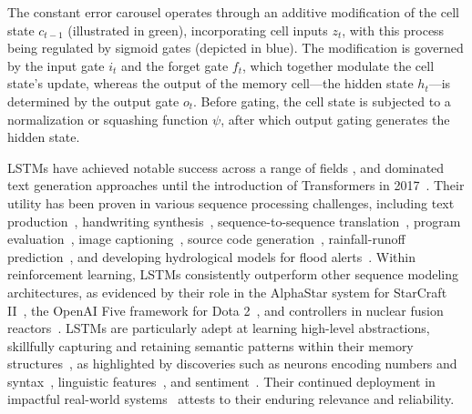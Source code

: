 The constant error carousel operates through an additive modification of the cell state $c_{t-1}$ (illustrated in green), incorporating cell inputs $z_t$, with this process being regulated by sigmoid gates (depicted in blue). The modification is governed by the input gate $i_t$ and the forget gate $f_t$, which together modulate the cell state's update, whereas the output of the memory cell—the hidden state $h_t$—is determined by the output gate $o_t$. Before gating, the cell state is subjected to a normalization or squashing function $\psi$, after which output gating generates the hidden state.

LSTMs have achieved notable success across a range of fields \citep{Hochreiter:01,Hochreiter:07,Schmidhuber:15}, and dominated text generation approaches until the introduction of Transformers in 2017~\citep{Vaswani:17}. Their utility has been proven in various sequence processing challenges, including text production~\citep{Graves:13,Karpathy:15blog}, handwriting synthesis~\citep{Graves:13}, sequence-to-sequence translation~\citep{Sutskever:14nips}, program evaluation~\citep{Zaremba:14arxiv}, image captioning~\citep{Karpathy:15,Hossain:19}, source code generation~\citep{Karpathy:15blog}, rainfall-runoff prediction~\citep{Kratzert:18,Kratzert:19}, and developing hydrological models for flood alerts~\citep{Nearing:24}. Within reinforcement learning, LSTMs consistently outperform other sequence modeling architectures, as evidenced by their role in the AlphaStar system for StarCraft II~\citep{Vinyals:17short}, the OpenAI Five framework for Dota 2~\citep{OpenAI:19}, and controllers in nuclear fusion reactors~\citep{Degrave:22short}. LSTMs are particularly adept at learning high-level abstractions, skillfully capturing and retaining semantic patterns within their memory structures~\citep{Karpathy:15blog}, as highlighted by discoveries such as neurons encoding numbers and syntax~\citep{Lakretz:19}, linguistic features~\citep{Bau:19}, and sentiment~\citep{Radford:17arxiv}. Their continued deployment in impactful real-world systems~\citep{Degrave:22short,Nearing:24} attests to their enduring relevance and reliability.

